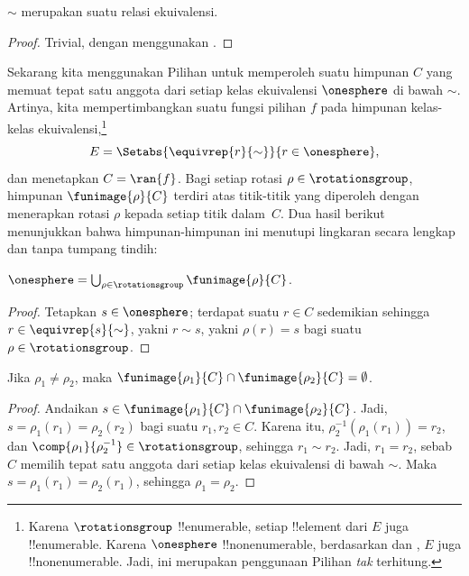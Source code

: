 \documentclass[../../../include/open-logic-section]{subfiles}
\begin{document}
\begin{lem}
$\sim$ merupakan suatu relasi ekuivalensi.
\end{lem}

\begin{proof}
Trivial, dengan menggunakan .
\end{proof}

Sekarang kita menggunakan Pilihan untuk memperoleh suatu himpunan $C$ yang
memuat tepat satu anggota dari setiap kelas ekuivalensi $\onesphere$ di bawah
$\sim$. Artinya, kita mempertimbangkan suatu fungsi pilihan $f$ pada
himpunan kelas-kelas ekuivalensi,\footnote{Karena $\rotationsgroup$
!!{enumerable}, setiap !!{element} dari $E$ juga !!{enumerable}. Karena
$\onesphere$ !!{nonenumerable}, berdasarkan  dan
, $E$ juga
!!{nonenumerable}. Jadi, ini merupakan penggunaan Pilihan \emph{tak}
terhitung.}
\[
	E = \Setabs{\equivrep{r}{\sim}}{r \in \onesphere},
\]
dan menetapkan $C=\ran{f}$. Bagi setiap rotasi
$\rho\in\rotationsgroup$, himpunan $\funimage{\rho}{C}$ terdiri atas
titik-titik yang diperoleh dengan menerapkan rotasi $\rho$ kepada setiap
titik dalam~$C$. Dua hasil berikut menunjukkan bahwa himpunan-himpunan ini
menutupi lingkaran secara lengkap dan tanpa tumpang tindih:

\begin{lem}
$\onesphere = \bigcup_{\rho \in \rotationsgroup} \funimage{\rho}{C}$.
\end{lem}

\begin{proof}
Tetapkan $s\in\onesphere$; terdapat suatu $r\in C$ sedemikian sehingga
$r\in\equivrep{s}{\sim}$, yakni $r\sim s$, yakni
$\rho(r)=s$ bagi suatu $\rho\in\rotationsgroup$.
\end{proof}

\begin{lem}
Jika $\rho_1 \neq \rho_2$, maka
$\funimage{\rho_1}{C} \cap \funimage{\rho_2}{C} = \emptyset$.
\end{lem}

\begin{proof}
Andaikan
$s\in\funimage{\rho_{1}}{C}\cap\funimage{\rho_{2}}{C}$. Jadi,
$s=\rho_{1}(r_{1})=\rho_{2}(r_{2})$ bagi suatu $r_{1},r_{2}\in C$.
Karena itu, $\rho^{-1}_2(\rho_1(r_1))=r_2$, dan
$\comp{\rho_1}{\rho^{-1}_2}\in\rotationsgroup$, sehingga
$r_1\sim r_2$. Jadi, $r_1=r_2$, sebab $C$ memilih tepat satu anggota dari
setiap kelas ekuivalensi di bawah $\sim$. Maka
$s=\rho_1(r_1)=\rho_2(r_1)$, sehingga $\rho_1=\rho_2$.
\end{proof}
\end{document}
